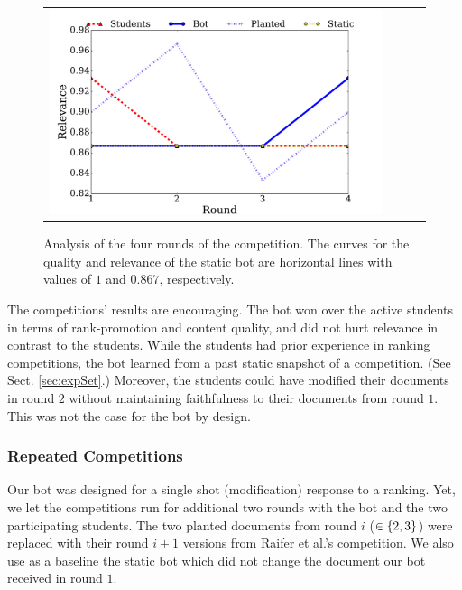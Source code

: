 \begin{figure}[t]
\begin{tabular}{cccc}
\hspace*{-.5cm} \includegraphics[width=\figWidth, height=\figHeight]{Results/rel} \\
  \end{tabular}
  \caption{\label{fig:competition} Analysis of the four rounds of the
    competition. The curves for the quality and relevance of the
    static bot are horizontal lines with values of $1$ and $0.867$, respectively.}
  \end{figure}


The competitions' results are encouraging. The bot won
over the active students in terms of rank-promotion and content quality, and did not hurt relevance in contrast to the students. While the students had prior experience in ranking
competitions, the bot learned from a past static snapshot of a competition. (See Sect. \ref{sec:expSet}.)
Moreover, the students could have modified their documents in round $2$ without maintaining faithfulness to their documents from round $1$. This was not the case for the bot by design.



\subsubsection{Repeated Competitions}
Our bot was designed for a single shot (modification) response to a ranking. Yet, we let the competitions run for additional two
rounds with the bot and the two participating students.
The two planted documents from
round $i$ ($\in \{2,3\}$) were replaced with their round $i+1$
versions from Raifer et al.'s competition.
We also use as a baseline the static bot which did not change the
document our bot received in round $1$.


